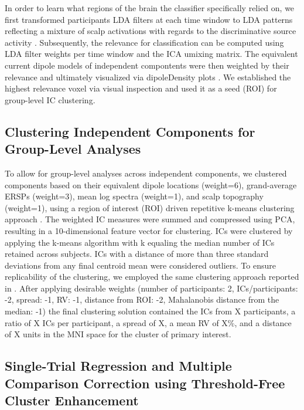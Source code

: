 In order to learn what regions of the brain the classifier specifically relied on, we first transformed participants LDA filters at each time window to LDA patterns reflecting a mixture of scalp activations with regards to the discriminative source activity \cite{Haufe2014a, Zander2016, Krol2019}. Subsequently, the relevance for classification can be computed using LDA filter weights per time window and the ICA umixing matrix. The equivalent current dipole models of independent compontents were then weighted by their relevance and ultimately visualized via dipoleDensity plots \cite{}. We established the highest relevance voxel via visual inspection and used it as a seed (ROI) for group-level IC clustering.

\subsection{Clustering Independent Components for Group-Level Analyses}
To allow for group-level analyses across independent components, we clustered components based on their equivalent dipole locations (weight=6), grand-average ERSPs (weight=3), mean log spectra (weight=1), and scalp topography (weight=1), using a region of interest (ROI) driven repetitive k-means clustering approach \cite{cleaning_FH2018}. The weighted IC measures were summed and compressed using PCA, resulting in a 10-dimensional feature vector for clustering. ICs were clustered by applying the k-means algorithm with k equaling the median number of ICs retained across subjects. ICs with a distance of more than three standard deviations from any final centroid mean were considered outliers. To ensure replicability of the clustering, we employed the same clustering approach reported in \cite{cleaning_FH2018}. After applying desirable weights (number of participants: 2, ICs/participants: -2, spread: -1, RV: -1, distance from ROI: -2, Mahalanobis distance from the median: -1) the final clustering solution contained the ICs from X participants, a ratio of X ICs per participant, a spread of X, a mean RV of X\%, and a distance of X units in the MNI space for the cluster of primary interest.

\subsection{Single-Trial Regression and Multiple Comparison Correction using Threshold-Free Cluster Enhancement}
